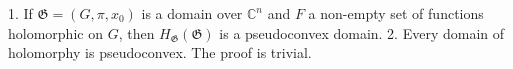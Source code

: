 1. If $\mathfrak{G} = (G, \pi, x_0)$ is a domain over $\mathbb{C}^n$ and $F$ a non-empty set of functions holomorphic on $G$, then $H_\mathfrak{G}(\mathfrak{G})$ is a pseudoconvex domain.
2. Every domain of holomorphy is pseudoconvex.
The proof is trivial.
